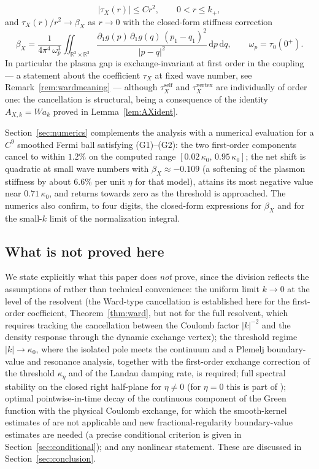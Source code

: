\documentclass[11pt,a4paper]{amsart}
\theoremstyle{definition}
\theoremstyle{remark}
\newcommand{\R}{\mathbb{R}}
\newcommand{\dd}{\,\mathrm{d}}
\begin{document}
\begin{itemize}
\[
|\tau_X(r)|\le C r^2,\qquad 0<r\le k_+,
\]
and $\tau_X(r)/r^2\to\beta_X$ as $r\to0$ with the closed-form stiffness correction
\[
\beta_X=\frac{1}{4\pi^4\,\omega_p^3}\iint_{\R^3\times\R^3}
\frac{\partial_1g(p)\,\partial_1g(q)\,(p_1-q_1)^2}{|p-q|^2}\dd p\dd q,
\qquad \omega_p=\tau_0(0^+).
\]
In particular the plasma gap is exchange-invariant at first order in the coupling --- a statement about the coefficient $\tau_X$ at fixed wave number, see Remark~\ref{rem:wardmeaning} --- although $\tau_X^{\mathrm{self}}$ and $\tau_X^{\mathrm{vertex}}$ are individually of order one: the cancellation is structural, being a consequence of the identity $A_{X,k}=Wa_k$ proved in Lemma~\ref{lem:AXident}.
\end{itemize}

Section~\ref{sec:numerics} complements the analysis with a numerical evaluation for a $C^9$ smoothed Fermi ball satisfying \textup{(G1)--(G2)}: the two first-order components cancel to within $1.2\%$ on the computed range $[0.02\,\kappa_0,\,0.95\,\kappa_0]$; the net shift is quadratic at small wave numbers with $\beta_X\approx-0.109$ (a softening of the plasmon stiffness by about $6.6\%$ per unit $\eta$ for that model), attains its most negative value near $0.71\,\kappa_0$, and returns towards zero as the threshold is approached. The numerics also confirm, to four digits, the closed-form expressions for $\beta_X$ and for the small-$k$ limit of the normalization integral.

\subsection{What is not proved here}\label{sec:notproved}
We state explicitly what this paper does \emph{not} prove, since the division reflects the assumptions of \cite{NY1,NY2} rather than technical convenience: the uniform limit $k\to0$ at the level of the resolvent (the Ward-type cancellation is established here for the first-order coefficient, Theorem~\ref{thm:ward}, but not for the full resolvent, which requires tracking the cancellation between the Coulomb factor $|k|^{-2}$ and the density response through the dynamic exchange vertex); the threshold regime $|k|\to\kappa_0$, where the isolated pole meets the continuum and a Plemelj boundary-value and resonance analysis, together with the first-order exchange correction of the threshold $\kappa_\eta$ and of the Landau damping rate, is required; full spectral stability on the closed right half-plane for $\eta\ne0$ (for $\eta=0$ this is part of \cite[Theorem~1.1]{NY1}); optimal pointwise-in-time decay of the continuous component of the Green function with the physical Coulomb exchange, for which the smooth-kernel estimates of \cite{NY2} are not applicable and new fractional-regularity boundary-value estimates are needed (a precise conditional criterion is given in Section~\ref{sec:conditional}); and any nonlinear statement. These are discussed in Section~\ref{sec:conclusion}.
\end{document}
